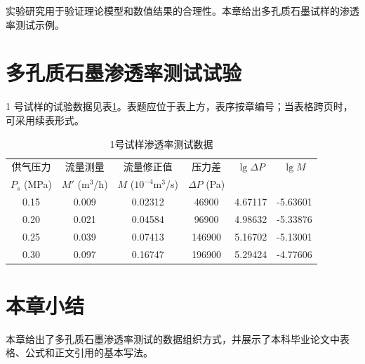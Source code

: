 实验研究用于验证理论模型和数值结果的合理性。本章给出多孔质石墨试样的渗透率测试示例。

\section{多孔质石墨渗透率测试试验}

1 号试样的试验数据见表\ref{tab:permeability-data}。表题应位于表上方，表序按章编号；当表格跨页时，可采用续表形式。

\begin{table}[htbp]
  \centering
  \caption{1号试样渗透率测试数据}
  \label{tab:permeability-data}
  \begin{tabular}{cccccc}
    \hline
    供气压力 & 流量测量 & 流量修正值 & 压力差 & $\lg\Delta P$ & $\lg M$ \\
    $P_s$ (MPa) & $M'$ (m$^3$/h) & $M$ ($10^{-4}$m$^3$/s) & $\Delta P$ (Pa) & & \\
    \hline
    0.15 & 0.009 & 0.02312 & 46900  & 4.67117 & -5.63601 \\
    0.20 & 0.021 & 0.04584 & 96900  & 4.98632 & -5.33876 \\
    0.25 & 0.039 & 0.07413 & 146900 & 5.16702 & -5.13001 \\
    0.30 & 0.097 & 0.16747 & 196900 & 5.29424 & -4.77606 \\
    \hline
  \end{tabular}
\end{table}

\section{本章小结}

本章给出了多孔质石墨渗透率测试的数据组织方式，并展示了本科毕业论文中表格、公式和正文引用的基本写法。
